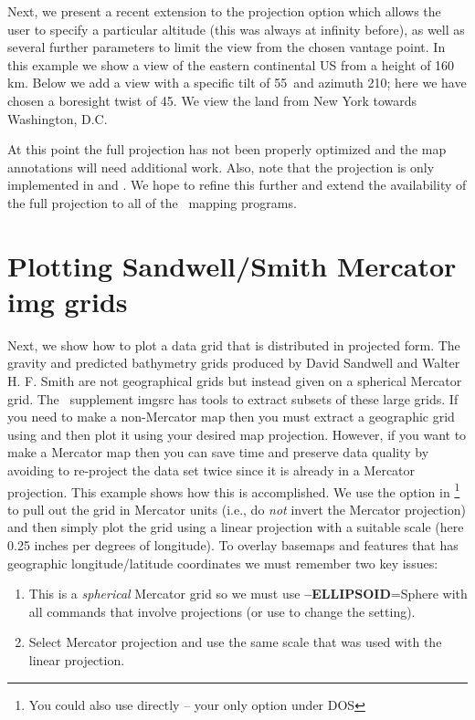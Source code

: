 Next, we present a recent extension to the  projection option which allows the user
to specify a particular altitude (this was always at infinity before), as well as several
further parameters to limit the view from the chosen vantage point.  In this example we show
a view of the eastern continental US from a height of 160 km.  Below we add a view with a specific tilt of
55\DS\ and azimuth 210\DS; here we have chosen a boresight twist of 45\DS.  We view the land from
New York towards Washington, D.C.


At this point the full projection has not been properly optimized and the map annotations will need
additional work.  Also, note that the projection is only implemented in  and .
We hope to refine this further and extend the availability of the full projection to all of the
\GMT\ mapping programs.

 

\section{Plotting Sandwell/Smith Mercator img grids}

Next, we show how to plot a data grid that is distributed in projected form.  The gravity and
predicted bathymetry grids produced by David Sandwell and Walter H. F. Smith are not geographical
grids but instead given on a spherical Mercator grid.  The \GMT\ supplement imgsrc has tools to
extract subsets of these large grids.  If you need to make a non-Mercator map then you must extract
a geographic grid using  and then plot it using your desired map projection.
However, if you want to make a Mercator map then you can save time and preserve data quality by
avoiding to re-project the data set twice since it is already in a Mercator projection.  This example
shows how this is accomplished.  We use the  option in \footnote{You could
also use  directly -- your only option under DOS} to pull out the
grid in Mercator units (i.e., do \emph{not} invert the Mercator projection) and then simply plot the
grid using a linear projection with a suitable scale (here 0.25 inches per degrees of longitude).
To overlay basemaps and features that has geographic longitude/latitude coordinates we must remember
two key issues:
\begin{enumerate}
	\item This is a \emph{spherical} Mercator grid so we must use {\bf --ELLIPSOID}=Sphere with all
	commands that involve projections (or use  to change the setting).
	\item Select Mercator projection and use the same scale that was used with the linear projection.
\end{enumerate}

